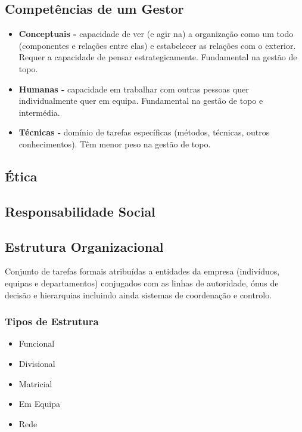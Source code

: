 \documentclass[11pt]{article}
\begin{document}
\subsection{Competências de um Gestor}

\begin{itemize}
    \item \textbf{Conceptuais -} capacidade de ver (e agir na) a organização como um todo (componentes e relações entre elas) e estabelecer as relações com o exterior. Requer a capacidade de pensar estrategicamente. Fundamental na gestão de topo.
    \item \textbf{Humanas -} capacidade em trabalhar com outras pessoas quer individualmente quer em equipa. Fundamental na gestão de topo e intermédia.
    \item \textbf{Técnicas -} domínio de tarefas específicas (métodos, técnicas, outros conhecimentos). Têm menor peso na gestão de topo.
\end{itemize}

\subsection{Ética}

\subsection{Responsabilidade Social}

\subsection{Estrutura Organizacional}

Conjunto de tarefas formais atribuídas a entidades da empresa (indivíduos, equipas e departamentos) conjugados com as linhas de autoridade, ónus de decisão e hierarquias
incluindo ainda sistemas de coordenação e controlo.

\subsubsection{Tipos de Estrutura}

\begin{itemize}
    \item Funcional
    \item Divisional
    \item Matricial
    \item Em Equipa
    \item Rede
\end{itemize}
\end{document}
